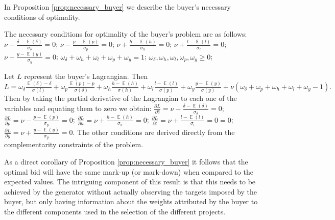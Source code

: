 \documentclass[informs]{informs3}
\begin{document}
In Proposition \ref{prop:necessary_buyer} we describe the buyer's necessary conditions of optimality. 
 
 
\begin{proposition}\label{prop:necessary_buyer}
The necessary conditions for optimality of the buyer's problem are as follows:
$\nu - \frac{\delta-\mathop{\mathbb{E}}\left(\delta\right)}{\sigma_{\delta}}=0$;
$\nu - \frac{p-\mathop{\mathbb{E}}\left(p\right)}{\sigma_{p}}=0$;
$\nu + \frac{h-\mathop{\mathbb{E}}\left(h\right)}{\sigma_{h}}=0$;
$\nu + \frac{l-\mathop{\mathbb{E}}\left(l\right)}{\sigma_{l}}=0$;
$\nu + \frac{y-\mathop{\mathbb{E}}\left(y\right)}{\sigma_{y}}=0$;
$\omega_{\delta}+\omega_{h}+\omega_{l}+\omega_{p}+\omega_{y}=1 $;		
$\omega_{\delta},\omega_{h},\omega_{l},\omega_{p},\omega_{y} \geq 0$;
\end{proposition}
%
Let $L$ represent the buyer's Lagrangian. Then 
$L =\omega_{\delta}\frac{\mathop{\mathbb{E}}\left(\delta\right)-\delta }
{\sigma\left(l\right)}+\omega_{p}\frac{\mathop{\mathbb{E}}\left(p\right)-p}  {\sigma\left(\delta\right)} 
+\omega_{h}\frac{ h-\mathop{\mathbb{E}}\left(h\right)}
{\sigma\left(h\right)}+\omega_{l}\frac{ l-\mathop{\mathbb{E}}\left(l\right) }{\sigma\left(p\right)}+\omega_{y}\frac{y-\mathop{\mathbb{E}}\left(y\right)}{\sigma\left(y\right)}+\nu (\omega_{\delta}+\omega_{p}+\omega_{h}+\omega_{l}+\omega_{y}-1).$ 
Then by taking the partial derivative of the Lagrangian to each one of the variables and equating them to zero we obtain:
$\frac{\partial L}{\partial \delta} = \nu - \frac{\delta-\mathop{\mathbb{E}}\left(\delta\right)}{\sigma_{\delta}}=0$;
$\frac{\partial L}{\partial p} = \nu - \frac{p-\mathop{\mathbb{E}}\left(p\right)}{\sigma_{p}}=0$;
$\frac{\partial L}{\partial h} = \nu + \frac{h-\mathop{\mathbb{E}}\left(h\right)}{\sigma_{h}}=0$;
$\frac{\partial L}{\partial l} = \nu + \frac{l-\mathop{\mathbb{E}}\left(l\right)}{\sigma_{l}}=0=0$;
$\frac{\partial L}{\partial y} = \nu + \frac{y-\mathop{\mathbb{E}}\left(y\right)}{\sigma_{y}}=0$.
The other conditions are derived directly from the complementarity constraints of the problem. %
\Halmos
\endproof 

As a direct corollary of Proposition  \ref{prop:necessary_buyer} it follows that the optimal bid will have the same mark-up (or mark-down) when compared to the expected values. The intriguing component of this result is that this needs to be achieved by the generator without actually observing the targets imposed by the buyer, but only having information about the weights attributed by the buyer to the different components used in the selection of the different projects.  
\end{document}
